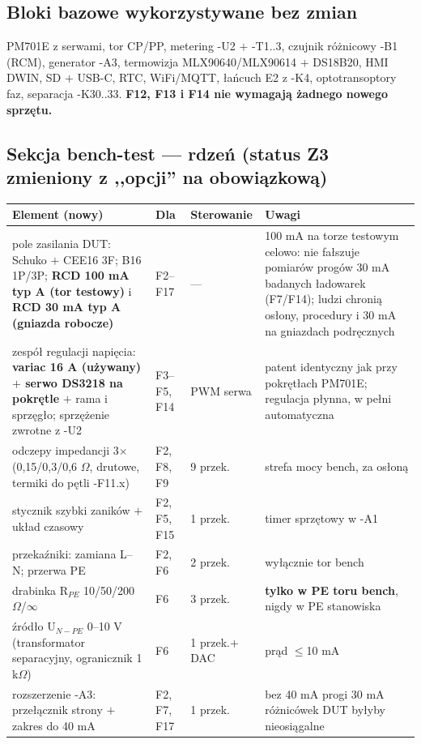 \documentclass[11pt,a4paper]{article}
\newcommand{\ohm}{$\Omega$}
\begin{document}
\subsection{Bloki bazowe wykorzystywane bez zmian}
PM701E z serwami, tor CP/PP, metering -U2 $+$ -T1..3, czujnik różnicowy -B1 (RCM), generator -A3,
termowizja MLX90640/MLX90614 $+$ DS18B20, HMI DWIN, SD $+$ USB-C, RTC, WiFi/MQTT, łańcuch E2
z -K4, optotransoptory faz, separacja -K30..33. \textbf{F12, F13 i F14 nie wymagają żadnego
nowego sprzętu.}
\subsection{Sekcja bench-test --- rdzeń (status Z3 zmieniony z ,,opcji'' na obowiązkową)}
\begin{longtable}{@{}p{}p{}p{}p{}@{}}
\toprule
\textbf{Element (nowy)} & \textbf{Dla} & \textbf{Sterowanie} & \textbf{Uwagi}\\
\midrule
pole zasilania DUT: Schuko $+$ CEE16 3F; B16 1P/3P; \textbf{RCD 100 mA typ A (tor testowy)}
i \textbf{RCD 30 mA typ A (gniazda robocze)} & F2--F17 & --- & 100 mA na torze testowym celowo:
nie fałszuje pomiarów progów 30 mA badanych ładowarek (F7/F14); ludzi chronią osłony, procedury
i 30 mA na gniazdach podręcznych\\
zespół regulacji napięcia: \textbf{variac 16 A (używany) $+$ serwo DS3218 na pokrętle} $+$ rama
i sprzęgło; sprzężenie zwrotne z -U2 & F3--F5, F14 & PWM serwa & patent identyczny jak przy
pokrętłach PM701E; regulacja płynna, w pełni automatyczna\\
odczepy impedancji 3$\times$(0,15/0,3/0,6 \ohm, drutowe, termiki do pętli -F11.x) & F2, F8, F9 &
9 przek. & strefa mocy bench, za osłoną\\
stycznik szybki zaników $+$ układ czasowy & F2, F5, F15 & 1 przek. & timer sprzętowy w -A1\\
przekaźniki: zamiana L--N; przerwa PE & F2, F6 & 2 przek. & wyłącznie tor bench\\
drabinka R$_{PE}$ 10/50/200 \ohm/$\infty$ & F6 & 3 przek. & \textbf{tylko w PE toru bench},
nigdy w PE stanowiska\\
źródło U$_{N-PE}$ 0--10 V (transformator separacyjny, ogranicznik 1 k\ohm) & F6 & 1 przek.$+$DAC &
prąd $\le$10 mA\\
rozszerzenie -A3: przełącznik strony $+$ zakres do 40 mA & F2, F7, F17 & 1 przek. & bez 40 mA
progi 30 mA różnicówek DUT byłyby nieosiągalne\\

\end{longtable}
\end{document}
